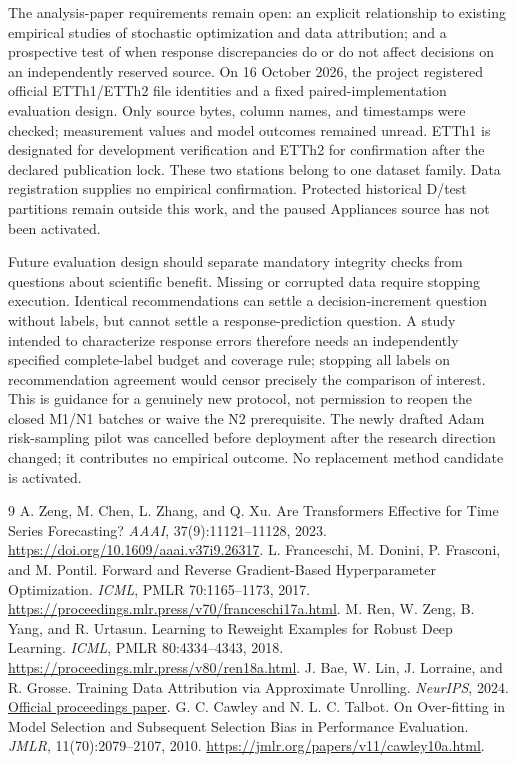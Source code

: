 \documentclass[11pt]{article}
\begin{document}
The analysis-paper requirements remain open: an explicit relationship to existing empirical studies of stochastic optimization and data attribution; and a prospective test of when response discrepancies do or do not affect decisions on an independently reserved source. On 16 October 2026, the project registered official ETTh1/ETTh2 file identities and a fixed paired-implementation evaluation design. Only source bytes, column names, and timestamps were checked; measurement values and model outcomes remained unread. ETTh1 is designated for development verification and ETTh2 for confirmation after the declared publication lock. These two stations belong to one dataset family. Data registration supplies no empirical confirmation. Protected historical D/test partitions remain outside this work, and the paused Appliances source has not been activated.

Future evaluation design should separate mandatory integrity checks from questions about scientific benefit. Missing or corrupted data require stopping execution. Identical recommendations can settle a decision-increment question without labels, but cannot settle a response-prediction question. A study intended to characterize response errors therefore needs an independently specified complete-label budget and coverage rule; stopping all labels on recommendation agreement would censor precisely the comparison of interest. This is guidance for a genuinely new protocol, not permission to reopen the closed M1/N1 batches or waive the N2 prerequisite. The newly drafted Adam risk-sampling pilot was cancelled before deployment after the research direction changed; it contributes no empirical outcome. No replacement method candidate is activated.

\begin{thebibliography}{9}
 A. Zeng, M. Chen, L. Zhang, and Q. Xu. Are Transformers Effective for Time Series Forecasting? \emph{AAAI}, 37(9):11121--11128, 2023. \url{https://doi.org/10.1609/aaai.v37i9.26317}.
 L. Franceschi, M. Donini, P. Frasconi, and M. Pontil. Forward and Reverse Gradient-Based Hyperparameter Optimization. \emph{ICML}, PMLR 70:1165--1173, 2017. \url{https://proceedings.mlr.press/v70/franceschi17a.html}.
 M. Ren, W. Zeng, B. Yang, and R. Urtasun. Learning to Reweight Examples for Robust Deep Learning. \emph{ICML}, PMLR 80:4334--4343, 2018. \url{https://proceedings.mlr.press/v80/ren18a.html}.
 J. Bae, W. Lin, J. Lorraine, and R. Grosse. Training Data Attribution via Approximate Unrolling. \emph{NeurIPS}, 2024. \href{https://papers.neurips.cc/paper_files/paper/2024/file/7af60ccb99c7a434a0d9d9c1fb00ca94-Paper-Conference.pdf}{Official proceedings paper}.
 G. C. Cawley and N. L. C. Talbot. On Over-fitting in Model Selection and Subsequent Selection Bias in Performance Evaluation. \emph{JMLR}, 11(70):2079--2107, 2010. \url{https://jmlr.org/papers/v11/cawley10a.html}.
\end{thebibliography}
\end{document}
